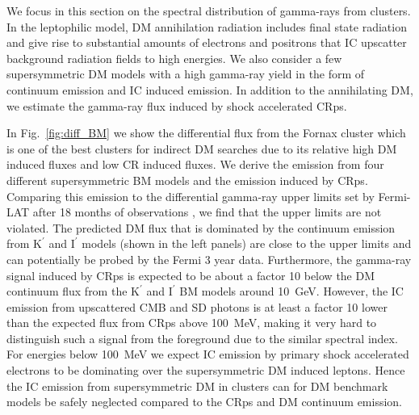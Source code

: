 \documentclass[10pt,aps,pra,reprint,amsmath,amsfonts,amssymb,showpacs,nofootinbib,floatfix]{revtex4-1}
\newcommand{\rmn}{\mathrm}
\newcommand{\Kp}{\rmn{K}^\prime}
\newcommand{\Ip}{\rmn{I}^\prime}
\begin{document}
We focus in this section on the spectral distribution of gamma-rays
from clusters.  In the leptophilic model, DM annihilation radiation
includes final state radiation and give rise to substantial amounts of
electrons and positrons that IC upscatter background radiation fields
to high energies. We also consider a few supersymmetric DM models with
a high gamma-ray yield in the form of continuum emission and IC
induced emission. In addition to the annihilating DM, we estimate the
gamma-ray flux induced by shock accelerated CRps.

In Fig.~\ref{fig:diff_BM} we show the differential flux from the
Fornax cluster which is one of the best clusters for indirect DM
searches due to its relative high DM induced fluxes and low CR induced
fluxes. We derive the emission from four different supersymmetric BM
models and the emission induced by CRps. Comparing this emission to
the differential gamma-ray upper limits set by Fermi-LAT after 18
months of observations \cite{2010ApJ...717L..71A}, we find that the
upper limits are not violated. The predicted DM flux that is dominated
by the continuum emission from $\Kp$ and $\Ip$ models (shown in the
left panels) are close to the upper limits and can potentially be
probed by the Fermi 3 year data. Furthermore, the gamma-ray signal
induced by CRps is expected to be about a factor 10 below the DM
continuum flux from the $\Kp$ and $\Ip$ BM models around
10~GeV. However, the IC emission from upscattered CMB and SD photons
is at least a factor 10 lower than the expected flux from CRps above
100~MeV, making it very hard to distinguish such a signal from the
foreground due to the similar spectral index. For energies below
100~MeV we expect IC emission by primary shock accelerated electrons
to be dominating \cite{2010MNRAS.409..449P} over the supersymmetric DM
induced leptons. Hence the IC emission from supersymmetric DM in
clusters can for DM benchmark models be safely neglected compared to
the CRps and DM continuum emission.
\end{document}
